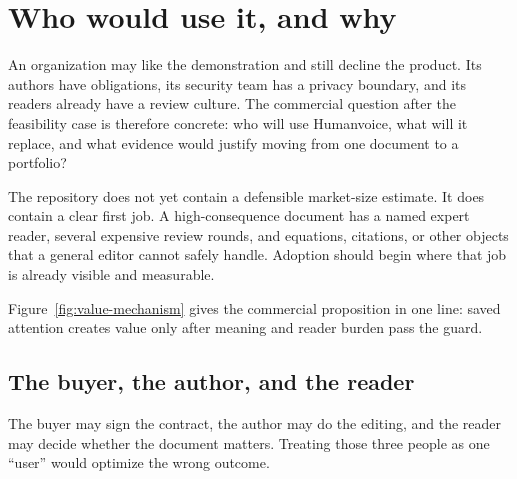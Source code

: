 \chapter{Who would use it, and why}
\label{ch:adoption-scale}

An organization may like the demonstration and still decline the product. Its
authors have obligations, its security team has a privacy boundary, and its
readers already have a review culture. The commercial question after the
feasibility case is therefore concrete: who will use Humanvoice, what will it
replace, and what evidence would justify moving from one document to a
portfolio?

The repository does not yet contain a defensible market-size estimate. It does
contain a clear first job. A high-consequence document has a named expert
reader, several expensive review rounds, and equations, citations, or other
objects that a general editor cannot safely handle. Adoption should begin where
that job is already visible and measurable.

Figure~\ref{fig:value-mechanism} gives the commercial proposition in one line:
saved attention creates value only after meaning and reader burden pass the
guard.

\hvFigureValueMechanism

\section{The buyer, the author, and the reader}
\label{sec:adoption-roles}

The buyer may sign the contract, the author may do the editing, and the reader
may decide whether the document matters. Treating those three people as one
``user'' would optimize the wrong outcome.

